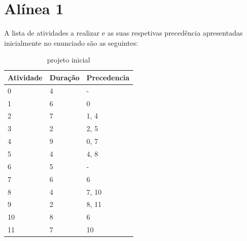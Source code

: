\documentclass[a4paper]{report}
\begin{document}
\section{Alínea 1}
A lista de atividades a realizar e as suas respetivas precedência apresentadas
inicialmente no enunciado são as seguintes:
\begin{table}[H]
    \centering
    \begin{tabular}{|l|l|l|}
        \hline
        Atividade & Duração & Precedencia \\ \hline
        0         & 4       & -           \\ \hline
        1         & 6       & 0           \\ \hline
        2         & 7       & 1, 4        \\ \hline
        3         & 2       & 2, 5        \\ \hline
        4         & 9       & 0, 7        \\ \hline
        5         & 4       & 4, 8        \\ \hline
        6         & 5       & -           \\ \hline
        7         & 6       & 6           \\ \hline
        8         & 4       & 7, 10       \\ \hline
        9         & 2       & 8, 11       \\ \hline
        10        & 8       & 6           \\ \hline
        11        & 7       & 10          \\ \hline
    \end{tabular}
    \caption{projeto inicial}
\end{table}
\end{document}
